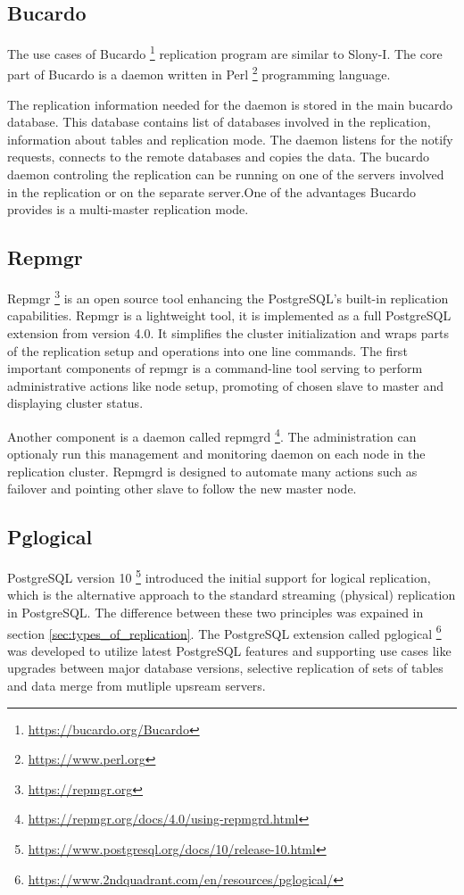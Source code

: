 \documentclass[
  digital, %
  twoside, %
  table,   %
  lof,     %
  lot,     %
]{fithesis3}
\begin{document}
\subsection{Bucardo}
The use cases of Bucardo \footnote{\url{https://bucardo.org/Bucardo}} replication program are similar to Slony-I. The core part of Bucardo is a daemon written in Perl \footnote{\url{https://www.perl.org}} programming language.

The replication information needed for the daemon is stored in the main bucardo database. This database contains list of databases involved in the replication, information about tables and replication mode. The daemon listens for the notify requests, connects to the remote databases and copies the data. The bucardo daemon controling the replication can be running on one of the servers involved in the replication or on the separate server.One of the advantages Bucardo provides is a multi-master replication mode.

\subsection{Repmgr}
Repmgr \footnote{\url{https://repmgr.org}} is an open source tool enhancing the PostgreSQL's built-in replication capabilities. Repmgr is a lightweight tool, it is implemented as a full PostgreSQL extension from version 4.0. It simplifies the cluster initialization and wraps parts of the replication setup and operations into one line commands.
The first important components of repmgr is a command-line tool serving to perform administrative actions like node setup, promoting of chosen slave to master and displaying cluster status.

Another component is a daemon called repmgrd \footnote{\url{https://repmgr.org/docs/4.0/using-repmgrd.html}}. The administration can optionaly run this management and monitoring daemon on each node in the replication cluster. Repmgrd is designed to automate many actions such as failover and pointing other slave to follow the new master node.

\subsection{Pglogical}
PostgreSQL version 10 \footnote{\url{https://www.postgresql.org/docs/10/release-10.html}} introduced the initial support for logical replication, which is the alternative approach to the standard streaming (physical) replication in PostgreSQL. The difference between these two principles was expained in section \ref{sec:types_of_replication}. The PostgreSQL extension called pglogical \footnote{\url{https://www.2ndquadrant.com/en/resources/pglogical/}} was developed to utilize latest PostgreSQL features and supporting use cases like upgrades between major database versions, selective replication of sets of tables and data merge from mutliple upsream servers.
\end{document}

